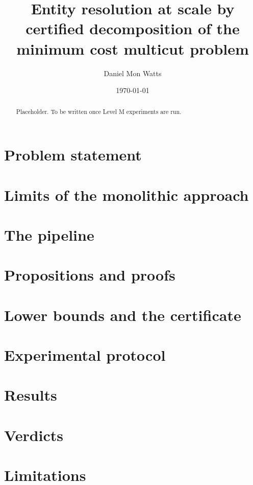 \documentclass[11pt]{article}
\title{Entity resolution at scale by certified decomposition of the minimum cost multicut problem}
\author{Daniel Mon Watts}
\date{\today}
\begin{document}
\maketitle

\begin{abstract}
Placeholder. To be written once Level M experiments are run.
\end{abstract}

\section{Problem statement}
\section{Limits of the monolithic approach}
\section{The pipeline}
\section{Propositions and proofs}
\section{Lower bounds and the certificate}
\section{Experimental protocol}
\section{Results}
\section{Verdicts}
\section{Limitations}
\end{document}
